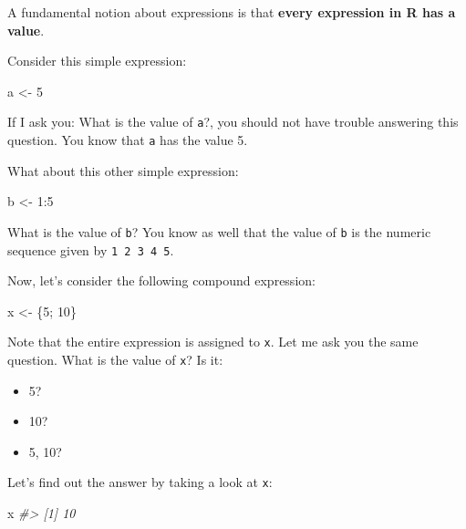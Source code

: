 \documentclass[
]{book}
\newenvironment{Shaded}{\begin{snugshade}}{\end{snugshade}}
\newcommand{\CommentTok}[1]{\textcolor[rgb]{0.56,0.35,0.01}{\textit{#1}}}
\newcommand{\DecValTok}[1]{\textcolor[rgb]{0.00,0.00,0.81}{#1}}
\newcommand{\NormalTok}[1]{#1}
\newcommand{\OtherTok}[1]{\textcolor[rgb]{0.56,0.35,0.01}{#1}}
\newcommand{\SpecialCharTok}[1]{\textcolor[rgb]{0.00,0.00,0.00}{#1}}
\providecommand{\tightlist}{%
  \setlength{\itemsep}{0pt}\setlength{\parskip}{0pt}}
\begin{document}
A fundamental notion about expressions is that
\textbf{every expression in R has a value}.

Consider this simple expression:

\begin{Shaded}
\begin{Highlighting}[]
\NormalTok{a }\OtherTok{\textless{}{-}} \DecValTok{5}
\end{Highlighting}
\end{Shaded}

If I ask you: What is the value of \texttt{a}?, you should not have trouble answering
this question. You know that \texttt{a} has the value 5.

What about this other simple expression:

\begin{Shaded}
\begin{Highlighting}[]
\NormalTok{b }\OtherTok{\textless{}{-}} \DecValTok{1}\SpecialCharTok{:}\DecValTok{5}
\end{Highlighting}
\end{Shaded}

What is the value of \texttt{b}? You know as well that the value of \texttt{b} is the
numeric sequence given by \texttt{1\ 2\ 3\ 4\ 5}.

Now, let's consider the following compound expression:

\begin{Shaded}
\begin{Highlighting}[]
\NormalTok{x }\OtherTok{\textless{}{-}}\NormalTok{ \{}\DecValTok{5}\NormalTok{; }\DecValTok{10}\NormalTok{\}}
\end{Highlighting}
\end{Shaded}

Note that the entire expression is assigned to \texttt{x}. Let me ask you the same
question. What is the value of \texttt{x}? Is it:

\begin{itemize}
\tightlist
\item
  5?
\item
  10?
\item
  5, 10?
\end{itemize}

Let's find out the answer by taking a look at \texttt{x}:

\begin{Shaded}
\begin{Highlighting}[]
\NormalTok{x}
\CommentTok{\#\textgreater{} [1] 10}
\end{Highlighting}
\end{Shaded}
\end{document}
